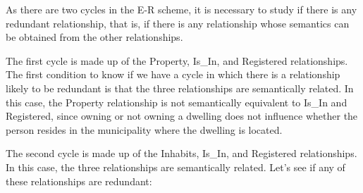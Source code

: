 \documentclass{article}
\numberwithin{figure}{section}
\begin{document}
As there are two cycles in the E-R scheme, it is necessary to study if there is any redundant relationship, that is, if there is any relationship whose semantics can be obtained from the other relationships.

The first cycle is made up of the Property, Is\_In, and Registered relationships.  The first condition to know if we have a cycle in which there is a relationship likely to be redundant is that the three relationships are semantically related.  In this case, the Property relationship is not semantically equivalent to Is\_In and Registered, since owning or not owning a dwelling does not influence whether the person resides in the municipality where the dwelling is located.

The second cycle is made up of the Inhabits, Is\_In, and Registered relationships.  In this case, the three relationships are semantically related.  Let's see if any of these relationships are redundant:
\end{document}
